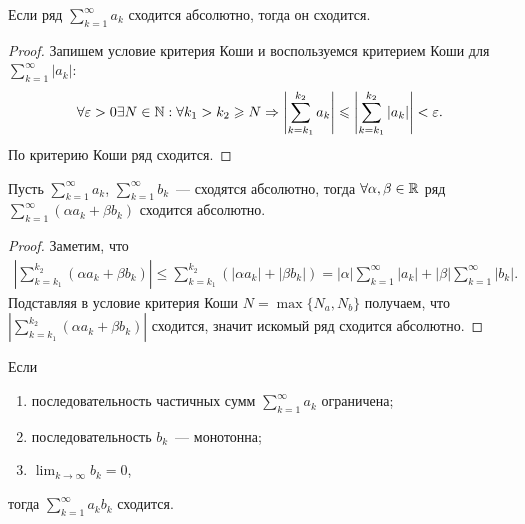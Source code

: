 \documentclass[../main.tex]{subfiles}
\begin{document}
\begin{proposition}
  Если ряд $ \sum_{k=1}^{\infty} a_k $ сходится абсолютно, тогда он сходится.
\end{proposition}

\begin{proof}
  Запишем условие критерия Коши и воспользуемся критерием Коши для $ \sum_{k=1}^{\infty} \left| a_k \right|  $: 
  \begin{gather} 
    \forall \varepsilon > 0 \exists N \in \mathbb{N}: \forall k_1 > k_2 \geqslant N \Rightarrow \left| \sum_{k=k_1 }^{k_2 }  a_k  \right| \leqslant \left| \sum_{k=k_1 }^{k_2 } \left| a_k \right|  \right| < \varepsilon.
  \end{gather} 
  По критерию Коши ряд сходится.
\end{proof}


\begin{proposition}
  Пусть $ \sum_{k=1}^{\infty} a_k $, $ \sum_{k=1}^{\infty} b_k $~--- сходятся абсолютно, тогда $\forall \alpha, \beta \in \mathbb{R}$ ряд $ \sum_{k=1}^{\infty} (\alpha a_k + \beta b_k ) $  сходится абсолютно. 
\end{proposition}


\begin{proof}
  Заметим, что 
  \begin{gather} 
    \left| \sum_{k=k_1 }^{k_2 } (\alpha a_k + \beta b_k )  \right| \leq \sum_{k=k_1 }^{k_2 } \left( \left| \alpha a_k  \right| + \left| \beta b_k  \right| \right) = \left| \alpha \right| \sum_{k=1}^{\infty} \left| a_k \right| + \left| \beta \right| \sum_{k=1}^{\infty} \left| b_k  \right| .  
  \end{gather}
  Подставляя в условие критерия Коши $N = \max \{ N_{a}, N_{b} \}$ получаем, что $ \left| \sum_{k=k_1 }^{k_2 } (\alpha a_k + \beta b_k )  \right| $  сходится, значит искомый ряд сходится абсолютно.
\end{proof}


\begin{proposition}
  Если
  \begin{enumerate} 
    \item последовательность частичных сумм $ \sum_{k=1}^{\infty} a_k $ ограничена;
    \item последовательность $b_k$~--- монотонна;
    \item $\lim_{k \to \infty} b_k = 0$,
  \end{enumerate}
  тогда $ \sum_{k=1}^{\infty} a_k b_k  $ сходится. 
\end{proposition}
\end{document}
